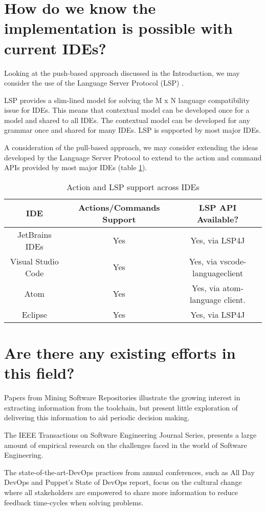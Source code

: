\section{How do we know the implementation is possible with current IDEs?}

Looking at the push-based approach discussed in the Introduction, we may consider the use of the Language Server Protocol (LSP) \parencite{lspGitHubSiteMSFT}.

LSP provides a slim-lined model for solving the M x N language compatibility issue for IDEs. This means that contextual model can be developed once for a model and shared to all IDEs. The contextual model can be developed for any grammar once and shared for many IDEs. LSP is supported by most major IDEs.

A consideration of the pull-based approach, we may consider extending the ideas developed by the Language Server Protocol to extend to the action and command APIs provided by most major IDEs (table \ref{table:1}).

\begin{table}
\centering
\begin{tabular}{ | c | c | c |}
	\hline
		IDE & Actions/Commands Support & LSP API Available?\\
	\hline
	\hline
		JetBrains IDEs & Yes & Yes, via LSP4J\\ 
		Visual Studio Code & Yes & Yes, via vscode-languageclient \\
		Atom & Yes & Yes, via atom-language client.\\
		Eclipse & Yes & Yes, via LSP4J\\
	\hline
\end{tabular}
\caption{Action and LSP support across IDEs}
\label{table:1}
\end{table}


\section{Are there any existing efforts in this field?}

Papers from Mining Software Repositories illustrate the growing interest in extracting information from the toolchain, but present little exploration of delivering this information to aid periodic decision making. 


The IEEE Transactions on Software Engineering Journal Series, presents a large amount of empirical research on the challenges faced in the world of Software Engineering. 


The state-of-the-art-DevOps practices from annual conferences, such as All Day DevOps and Puppet's State of DevOps report, focus on the cultural change where all stakeholders are empowered to share more information to reduce feedback time-cycles when solving problems.

